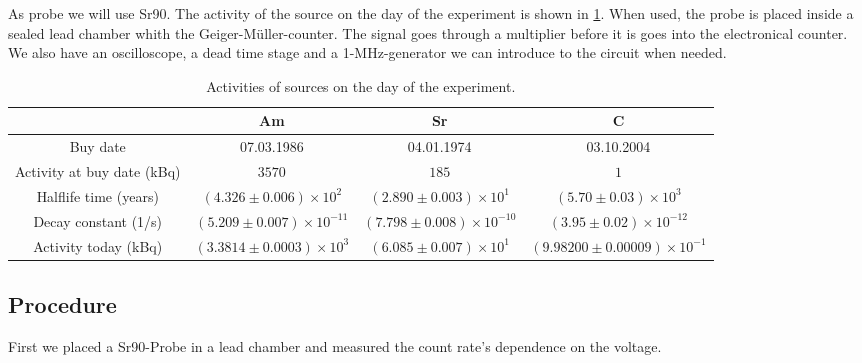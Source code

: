 As probe we will use Sr90. The activity of the source on the day of the experiment is shown in \cref{tab:Activity}. When used, the probe is placed inside a sealed lead chamber whith the Geiger-Müller-counter. The signal goes through a multiplier before it is goes into the electronical counter. We also have an oscilloscope, a dead time stage and a 1-MHz-generator we can introduce to the circuit when needed.

\begin{table}[H]
        \renewcommand{\arraystretch}{1}
        \centering
        \Large
        \begin{adjustbox}{width=\textwidth}
                \begin{tabular}{|c|c|c|c|}
                        \hline
                        & Am & Sr & C \\
                        \hline
                        Buy date & 07.03.1986 & 04.01.1974 & 03.10.2004 \\
                        \hline
                        Activity at buy date (kBq) & $3570$ & $185$ & $1$ \\
                        \hline
                        Halflife time (years) & $\left(4.326 \pm 0.006\right) \times 10^{2}$ & $\left(2.890 \pm 0.003\right) \times 10^{1}$ & $\left(5.70 \pm 0.03\right) \times 10^{3}$ \\
                        \hline
                        Decay constant (1/s) & $\left(5.209 \pm 0.007\right) \times 10^{-11}$ & $\left(7.798 \pm 0.008\right) \times 10^{-10}$ & $\left(3.95 \pm 0.02\right) \times 10^{-12}$ \\
                        \hline
                        Activity today (kBq) & $\left(3.3814 \pm 0.0003\right) \times 10^{3}$ & $\left(6.085 \pm 0.007\right) \times 10^{1}$ & $\left(9.98200 \pm 0.00009\right) \times 10^{-1}$ \\
                        \hline
                \end{tabular}
        \end{adjustbox}
        \caption{Activities of sources on the day of the experiment.}
        \label{tab:Activity}
\end{table}   

\subsection{Procedure}

First we placed a Sr90-Probe in a lead chamber and measured the count rate's dependence on the voltage.

